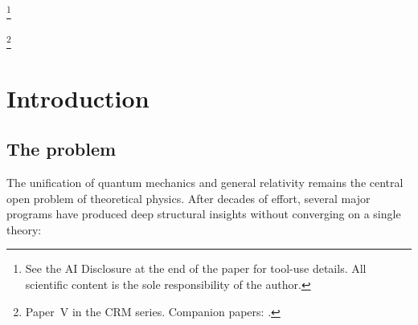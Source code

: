 \documentclass[aps,prd,twocolumn,superscriptaddress,nofootinbib]{revtex4-2}
\begin{document}

\thanks{See the AI Disclosure at the end of the paper for tool-use details. All scientific content is the sole responsibility of the author.}

\thanks{Paper~V in the CRM series. Companion papers: \cite{Geiger2026,Geiger2026b,Geiger2026c,Geiger2026d}.}

\begin{titlepage}
\maketitle
\end{titlepage}

\fi


\section{Introduction}
\label{sec:intro}

\subsection{The problem}

The unification of quantum mechanics and general relativity remains the central open problem of theoretical physics. After decades of effort, several major programs have produced deep structural insights without converging on a single theory:
\end{document}
